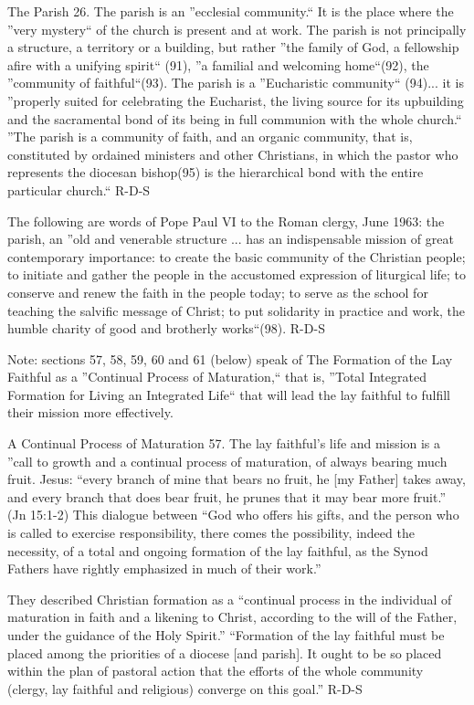\documentclass[oneside]{book}
\begin{document}
The Parish
26. The parish is an ''ecclesial community.`` It is the place where the ''very
mystery`` of the church is present and at work. The parish is not principally a
structure, a territory or a building, but rather ''the family of God, a
fellowship afire with a unifying spirit`` (91), ''a familial and welcoming
home``(92), the ''community of faithful``(93). The parish is a ''Eucharistic
community`` (94)... it is ''properly suited for celebrating the Eucharist, the
living source for its upbuilding and the sacramental bond of its being in full
communion with the whole church.``
''The parish is a community of faith, and an organic community, that is,
constituted by ordained ministers and other Christians, in which the pastor who
represents the diocesan bishop(95) is the hierarchical bond with the entire
particular church.``
R-D-S

The following are words of Pope Paul VI to the Roman clergy, June 1963: the
parish, an ''old and venerable structure ... has an indispensable mission of
great contemporary importance: to create the basic community of the Christian
people; to initiate and gather the people in the accustomed expression of
liturgical life; to conserve and renew the faith in the people today; to serve
as the school for teaching the salvific message of Christ; to put solidarity in
practice and work, the humble charity of good and brotherly works``(98).
R-D-S

Note: sections 57, 58, 59, 60 and 61 (below) speak of The Formation of the Lay
Faithful as a ''Continual Process of Maturation,`` that is, ''Total Integrated
Formation for Living an Integrated Life`` that will lead the lay faithful to
fulfill their mission more effectively.

A Continual Process of Maturation
57. The lay faithful's life and mission is a ''call to growth and a continual
process of maturation, of always bearing much fruit. Jesus: ``every branch of
mine that bears no fruit, he [my Father] takes away, and every branch that does
bear fruit, he prunes that it may bear more fruit.'' (Jn 15:1-2)
This dialogue between ``God who offers his gifts, and the person who is called
to exercise responsibility, there comes the possibility, indeed the necessity,
of a total and ongoing formation of the lay faithful, as the Synod Fathers have
rightly emphasized in much of their work.''

They described Christian formation as a ``continual process in the individual of
maturation in faith and a likening to Christ, according to the will of the
Father, under the guidance of the Holy Spirit.'' ``Formation of the lay faithful
must be placed among the priorities of a diocese [and parish]. It ought to be so
placed within the plan of pastoral action that the efforts of the whole
community (clergy, lay faithful and religious) converge on this goal.''
R-D-S
\end{document}
